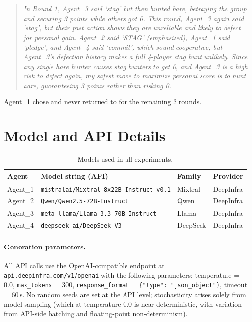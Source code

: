 \begin{quote}
\small\itshape
In Round 1, Agent\_3 said `stag' but then hunted hare, betraying the group and securing 3 points while others got 0. This round, Agent\_3 again said `stag', but their past action shows they are unreliable and likely to defect for personal gain. Agent\_2 said `STAG' (emphasized), Agent\_1 said `pledge', and Agent\_4 said `commit', which sound cooperative, but Agent\_3's defection history makes a full 4-player stag hunt unlikely. Since any single hare hunter causes stag hunters to get 0, and Agent\_3 is a high risk to defect again, my safest move to maximize personal score is to hunt hare, guaranteeing 3 points rather than risking 0.
\end{quote}

Agent\_1 chose  and never returned to  for the remaining 3 rounds.

\section{Model and API Details}\label{app:models}

\begin{table}[h]
\centering
\caption{Models used in all experiments.}\label{tab:models}
\smallskip
\begin{tabular}{@{}llll@{}}
\toprule
Agent & Model string (API) & Family & Provider \\
\midrule
Agent\_1 & \texttt{mistralai/Mixtral-8x22B-Instruct-v0.1} & Mixtral & DeepInfra \\
Agent\_2 & \texttt{Qwen/Qwen2.5-72B-Instruct} & Qwen & DeepInfra \\
Agent\_3 & \texttt{meta-llama/Llama-3.3-70B-Instruct} & Llama & DeepInfra \\
Agent\_4 & \texttt{deepseek-ai/DeepSeek-V3} & DeepSeek & DeepInfra \\
\bottomrule
\end{tabular}
\end{table}

\paragraph{Generation parameters.}
All API calls use the OpenAI-compatible endpoint at \texttt{api.deepinfra.com/v1/openai} with the following parameters:
temperature = 0.0,
\texttt{max\_tokens} = 300,
\texttt{response\_format} = \texttt{\{"type": "json\_object"\}},
timeout = 60\,s.
No random seeds are set at the API level; stochasticity arises solely from model sampling (which at temperature 0.0 is near-deterministic, with variation from API-side batching and floating-point non-determinism).


